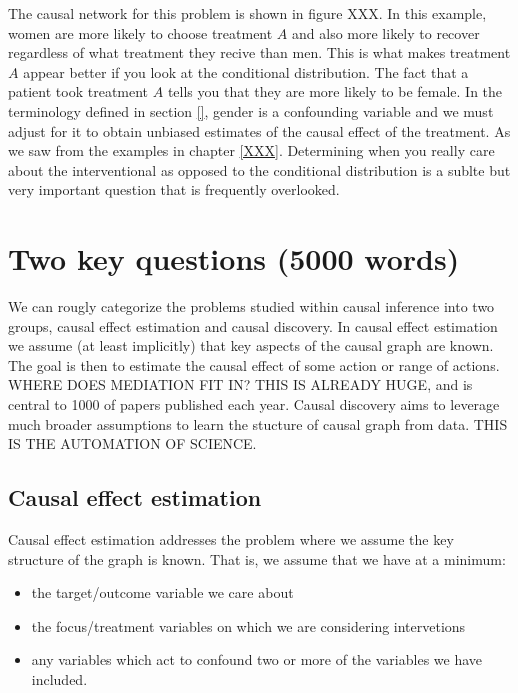 \documentclass[11pt,a4paper,oneside]{book}
\begin{document}
The causal network for this problem is shown in figure XXX. In this example, women are more likely to choose treatment $A$ and also more likely to recover regardless of what treatment they recive than men. This is what makes treatment $A$ appear better if you look at the conditional distribution. The fact that a patient took treatment $A$ tells you that they are more likely to be female. In the terminology defined in section \ref{}, gender is a confounding variable and we must adjust for it to obtain unbiased estimates of the causal effect of the treatment. As we saw from the examples in chapter \ref{XXX}. Determining when you really care about the interventional as opposed to the conditional distribution is a sublte but very important question that is frequently overlooked. 


\chapter*{Two key questions (5000 words)}

We can rougly categorize the problems studied within causal inference into two groups, causal effect estimation and causal discovery. In causal effect estimation we assume (at least implicitly) that key aspects of the causal graph are known. The goal is then to estimate the causal effect of some action or range of actions. WHERE DOES MEDIATION FIT IN? THIS IS ALREADY HUGE, and is central to 1000 of papers published each year. Causal discovery aims to leverage much broader assumptions to learn the stucture of causal graph from data. THIS IS THE AUTOMATION OF SCIENCE.

 
\section*{Causal effect estimation} 

Causal effect estimation addresses the problem where we assume the key structure of the graph is known. That is, we assume that we have at a minimum:

\begin{itemize}
\item the target/outcome variable we care about
\item the focus/treatment variables on which we are considering intervetions
\item any variables which act to confound two or more of the variables we have included.
\end{itemize}
\end{document}
